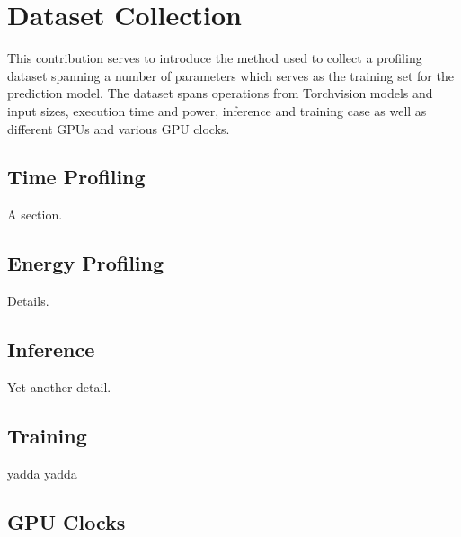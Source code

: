 \chapter{Dataset Collection}\label{chap:contrib1}

This contribution serves to introduce the method used
to collect a profiling dataset spanning a number of
parameters which serves as the training set for the
prediction model. The dataset spans operations from
Torchvision models and input sizes, execution time 
and power, inference and training case as well as
different GPUs and various GPU clocks.

\section{Time Profiling}

A section.

\section{Energy Profiling}

Details.

\section{Inference}

Yet another detail.

\section{Training}

yadda yadda

\section{GPU Clocks}